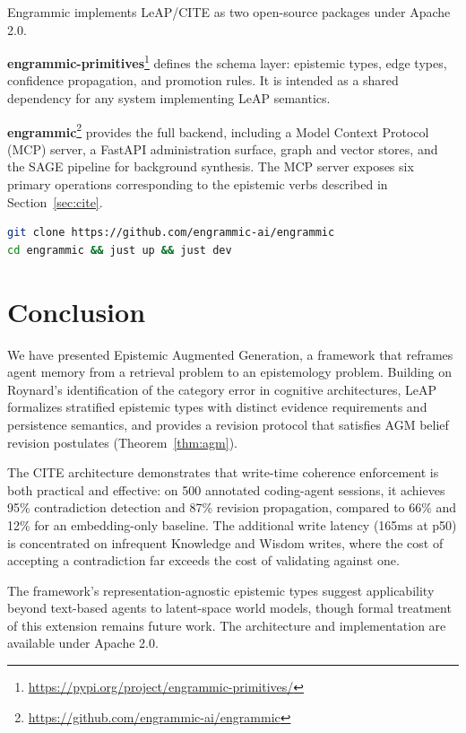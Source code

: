 \documentclass[11pt,letterpaper]{article}
\begin{document}
Engrammic implements LeAP/CITE as two open-source packages under Apache 2.0.

\textbf{engrammic-primitives}\footnote{\url{https://pypi.org/project/engrammic-primitives/}} defines the schema layer: epistemic types, edge types, confidence propagation, and promotion rules. It is intended as a shared dependency for any system implementing LeAP semantics.

\textbf{engrammic}\footnote{\url{https://github.com/engrammic-ai/engrammic}} provides the full backend, including a Model Context Protocol (MCP) server, a FastAPI administration surface, graph and vector stores, and the SAGE pipeline for background synthesis. The MCP server exposes six primary operations corresponding to the epistemic verbs described in Section~\ref{sec:cite}.

\begin{lstlisting}[language=bash]
git clone https://github.com/engrammic-ai/engrammic
cd engrammic && just up && just dev
\end{lstlisting}

\section{Conclusion}

We have presented Epistemic Augmented Generation, a framework that reframes agent memory from a retrieval problem to an epistemology problem. Building on Roynard's identification of the category error in cognitive architectures, LeAP formalizes stratified epistemic types with distinct evidence requirements and persistence semantics, and provides a revision protocol that satisfies AGM belief revision postulates (Theorem~\ref{thm:agm}).

The CITE architecture demonstrates that write-time coherence enforcement is both practical and effective: on 500 annotated coding-agent sessions, it achieves 95\% contradiction detection and 87\% revision propagation, compared to 66\% and 12\% for an embedding-only baseline. The additional write latency (165ms at p50) is concentrated on infrequent Knowledge and Wisdom writes, where the cost of accepting a contradiction far exceeds the cost of validating against one.

The framework's representation-agnostic epistemic types suggest applicability beyond text-based agents to latent-space world models, though formal treatment of this extension remains future work. The architecture and implementation are available under Apache 2.0.
\end{document}
